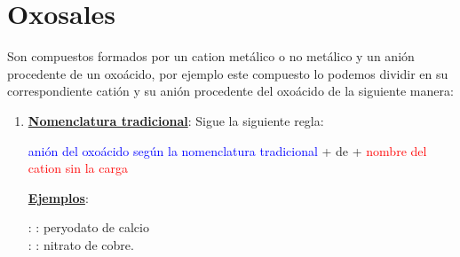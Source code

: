 \documentclass[11pt, a4paper]{article}
\begin{document}
\section{Oxosales}

Son compuestos formados por un cation metálico o no metálico y un anión procedente de un oxoácido, por ejemplo  este compuesto lo podemos dividir en su correspondiente catión  y su anión procedente del oxoácido  de la siguiente manera:
\begin{center}
\end{center}


\begin{enumerate}[label=\numberballblue]
    \item \textbf{\uline{Nomenclatura tradicional}}: Sigue la siguiente regla:
          \begin{center}
              \textcolor{blue}{anión del oxoácido según la nomenclatura tradicional} + de + \textcolor{red}{nombre del cation sin la carga}
          \end{center}

          \textbf{\uline{Ejemplos}}:

           :  : peryodato de calcio \\
           :  : nitrato de cobre.

\end{enumerate}
\end{document}
